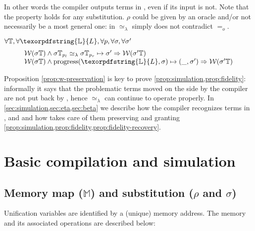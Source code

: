 \documentclass[sigconf,natbib=false,review]{acmart}
\newcommand{\EqualRel}{\ensuremath{=}}
\newcommand{\UnifRel}{\ensuremath{\simeq}}
\newcommand{\Eo}{\ensuremath{\EqualRel_o}\xspace}
\newcommand{\Ue}{\ensuremath{\UnifRel_\lambda}\xspace}
\newcommand{\linkStore}{\texorpdfstring{\ensuremath{\mathbb{L}}\xspace}{L}}
\newcommand{\mapStore}{\texorpdfstring{\ensuremath{\mathbb{M}}\xspace}{M}}
\newcommand{\hoUnifPb}{\ensuremath{\mathbb{T}}\xspace}
\begin{document}
\noindent
In other words the compiler outputs terms in \wellb, even if its
input is not.
Note that the property holds for any substitution. $\rho$ could be given by an
oracle and/or not necessarily be a most general one: in \wellb \Ue{} simply
does not contradict \Eo.

\begin{proposition}\label{prop:w-preservation}
$\forall \hoUnifPb, \forall \linkStore, \forall p, \forall \sigma, \forall \sigma'$
$$
\begin{array}{l}
\wellb(\sigma\hoUnifPb) \land
  \sigma\hoUnifPb_{p_l} \Ue \sigma\hoUnifPb_{p_r} \mapsto {\sigma'}
  \Rightarrow \wellb(\sigma' \hoUnifPb)\\
\wellb(\sigma\hoUnifPb) \land
  \progress(\linkStore,\sigma) \mapsto (\_,\sigma')
  \Rightarrow \wellb(\sigma' \hoUnifPb)
\end{array}
$$
\end{proposition}

\noindent
Proposition \ref{prop:w-preservation} is key to prove \cref{prop:simulation,prop:fidelity}:
informally it says that the problematic terms moved on the side by the compiler
are not put back by \hstep, hence \Ue{} can continue to operate properly.
In \cref{sec:simulation,sec:eta,sec:beta}
we describe how the compiler recognizes terms in \maybebeta, \maybeeta and
\notllambda and how \progress takes care of them preserving \wellb
and granting \cref{prop:simulation,prop:fidelity,prop:fidelity-recovery}.


\section{Basic compilation and simulation}
\label{sec:simulation}


\subsection{Memory map (\mapStore) and substitution (\texorpdfstring{$\rho$ and $\sigma$}{rho and sigma})}
\label{sec:grounwork}


% 

Unification variables are identified by a (unique) memory address.
The memory and its associated operations are described below:
\end{document}
